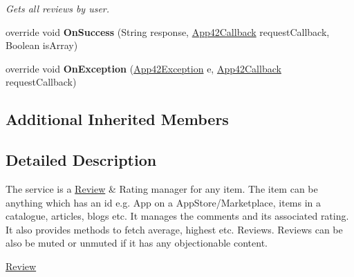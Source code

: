 \begin{DoxyCompactItemize}
\begin{DoxyCompactList}\small\item\em Gets all reviews by user. \end{DoxyCompactList}\item 
\hypertarget{classcom_1_1shephertz_1_1app42_1_1paas_1_1sdk_1_1windows_1_1review_1_1_review_service_add9f817db11aa638480df30c36613248}{override void {\bfseries On\+Success} (String response, \hyperlink{interfacecom_1_1shephertz_1_1app42_1_1paas_1_1sdk_1_1windows_1_1_app42_callback}{App42\+Callback} request\+Callback, Boolean is\+Array)}\label{classcom_1_1shephertz_1_1app42_1_1paas_1_1sdk_1_1windows_1_1review_1_1_review_service_add9f817db11aa638480df30c36613248}

\item 
\hypertarget{classcom_1_1shephertz_1_1app42_1_1paas_1_1sdk_1_1windows_1_1review_1_1_review_service_aaaa420a2d201584a7c846b6b085fe65e}{override void {\bfseries On\+Exception} (\hyperlink{classcom_1_1shephertz_1_1app42_1_1paas_1_1sdk_1_1windows_1_1_app42_exception}{App42\+Exception} e, \hyperlink{interfacecom_1_1shephertz_1_1app42_1_1paas_1_1sdk_1_1windows_1_1_app42_callback}{App42\+Callback} request\+Callback)}\label{classcom_1_1shephertz_1_1app42_1_1paas_1_1sdk_1_1windows_1_1review_1_1_review_service_aaaa420a2d201584a7c846b6b085fe65e}

\end{DoxyCompactItemize}
\subsection*{Additional Inherited Members}


\subsection{Detailed Description}
The service is a \hyperlink{classcom_1_1shephertz_1_1app42_1_1paas_1_1sdk_1_1windows_1_1review_1_1_review}{Review} \& Rating manager for any item. The item can be anything which has an id e.\+g. App on a App\+Store/\+Marketplace, items in a catalogue, articles, blogs etc. It manages the comments and its associated rating. It also provides methods to fetch average, highest etc. Reviews. Reviews can be also be muted or unmuted if it has any objectionable content. 

\hyperlink{classcom_1_1shephertz_1_1app42_1_1paas_1_1sdk_1_1windows_1_1review_1_1_review_service}{Review} 

